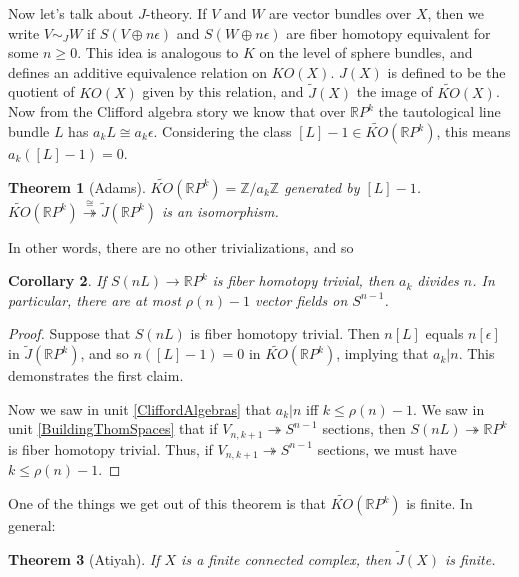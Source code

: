 \documentclass{article}
\newcommand{\Z}{\mathbb{Z}}
\newcommand{\R}{\mathbb{R}}
\newcommand{\RP}{\R P}
\newcommand{\onto}{\twoheadrightarrow}
\newtheorem{thm}{Theorem}[section]
\newtheorem{cor}[thm]{Corollary}
\begin{document}
Now let's talk about $J$-theory.  If $V$ and $W$ are vector bundles over $X$, then we write $V \sim_J W$ if $S(V \oplus n \epsilon)$ and $S(W \oplus n \epsilon)$ are fiber homotopy equivalent for some $n\geq0$. This idea is analogous to $K$ on the level of sphere bundles, and defines an additive equivalence relation on $KO(X)$. $J(X)$ is defined to be the quotient of $KO(X)$ given by this relation, and $\widetilde J(X)$ the image of $\widetilde{KO}(X)$. %
Now from the Clifford algebra story we know that over $\RP^k$ the tautological line bundle $L$ has $a_k L \cong a_k \epsilon$. %
Considering the class $[L] - 1 \in \widetilde{KO}(\RP^k)$, this means $a_k([L] - 1) = 0$. %
\begin{thm}[Adams]\label{AdamsKORPn}
$\widetilde{KO}(\RP^k)=\Z/a_k\Z$ generated by $[L]-1$.
$\widetilde{KO}(\RP^k) \stackrel{\cong}{\onto} \widetilde J(\RP^k)$ is an isomorphism.
\end{thm}
In other words, there are no other trivializations, and so %
\begin{cor}
If $S(nL) \to \RP^k$ is fiber homotopy trivial, then $a_k$ divides $n$. In particular, there are at most $\rho(n) - 1$ vector fields on $S^{n-1}$. %
\end{cor}
\begin{proof}
Suppose that $S(nL)$ is fiber homotopy trivial. Then $n[L]$ equals $n[\epsilon]$ in $\widetilde J(\R P^k)$, and so $n([L]-1)=0$ in $\widetilde{KO}(\RP^k)$, implying that $a_k|n$. This demonstrates the first claim.

Now we saw in unit \ref{CliffordAlgebras} that $a_k|n$ iff $k\leq \rho(n)-1$. We saw in unit \ref{BuildingThomSpaces} that if $V_{n, k+1} \onto S^{n-1}$ sections, then $S(nL)\onto \R P^{k}$ is fiber homotopy trivial. Thus, if $V_{n, k+1} \onto S^{n-1}$ sections, we must have $k\leq\rho(n)-1$.
\end{proof}
One of the things we get out of this theorem is that $\widetilde{KO}(\RP^k)$ is finite. In general: %
\begin{thm}[Atiyah]
If $X$ is a finite connected complex, then $\widetilde J(X)$ is finite.
\end{thm}
\end{document}

